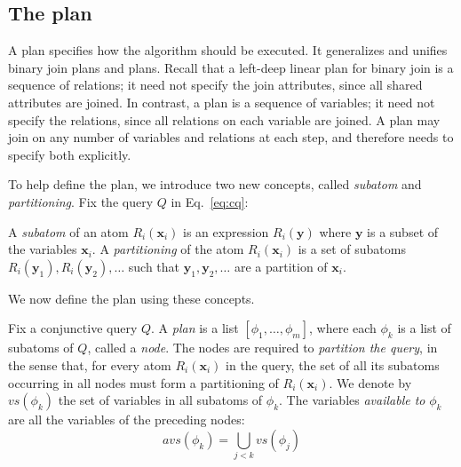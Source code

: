 \subsection{The \FJ plan}\label{sec:fj-plan}


A \FJ plan specifies how the \FJ algorithm should be executed.
It generalizes and unifies binary join plans and \GJ plans. 
Recall that a left-deep linear plan for binary join
  is a sequence of relations;
  it need not specify the join attributes, 
  since all shared attributes are joined.
In contrast, a \GJ plan is a sequence of variables;
  it need not specify the relations, 
  since all relations on each variable are joined.
A \FJ plan may join on any number of variables and relations at each step,
  and therefore needs to specify both explicitly.

  To help define the \FJ plan, we introduce two new concepts, called
  \emph{subatom} and \emph{partitioning}.  Fix the query $Q$ in
  Eq.~\eqref{eq:cq}:

\begin{defn}
  A \emph{subatom} of an atom $R_i(\bm x_i)$ is an expression
  $R_i(\bm y)$ where $\bm y$ is a subset of the variables $\bm x_i$.
  A \emph{partitioning} of the atom $R_i(\bm x_i)$ is a set of
  subatoms $R_i(\bm y_1), R_i(\bm y_2), \ldots$ such that
  $\bm y_1, \bm y_2, \ldots$ are a partition of $\bm x_i$.
\end{defn}

We now define the \FJ plan using these concepts.

\begin{defn}[\FJ Plan]
  Fix a conjunctive query $Q$.  A \FJ \emph{plan} is a list
  $[\phi_1, \ldots, \phi_m]$, where each $\phi_k$ is a list of
  subatoms of $Q$, called a {\em node}.  The nodes are required to
  {\em partition the query}, in the sense that, for every atom
  $R_i(\bm x_i)$ in the query, the set of all its subatoms occurring
  in all nodes must form a partitioning of $R_i(\bm x_i)$.  We denote
  by $vs(\phi_k)$ the set of variables in all subatoms of $\phi_k$.
  The variables \emph{available to} $\phi_k$ are all the variables of the
  preceding nodes:
%
$$avs(\phi_k) = \bigcup_{j < k} vs(\phi_j)$$
%
\end{defn}



